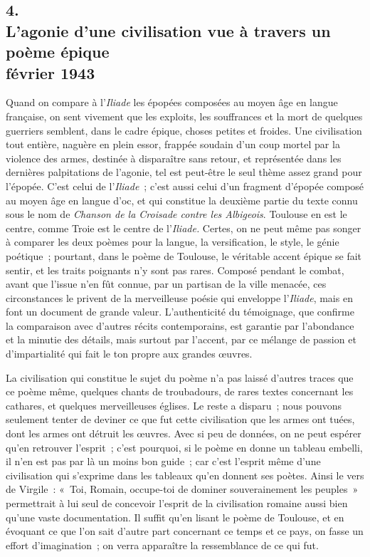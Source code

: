 \documentclass[french,twoside]{book} %
\begin{document}
\subsection[{4. L’agonie d’une civilisation vue à travers un poème épique, février 1943}]{4. \\
L’agonie d’une civilisation vue à travers un poème épique \\
février 1943}
\noindent \par
Quand on compare à l'{\itshape Iliade} les épopées composées au moyen âge en langue française, on sent vivement que les exploits, les souffrances et la mort de quelques guerriers semblent, dans le cadre épique, choses petites et froides. Une civilisation tout entière, naguère en plein essor, frappée soudain d'un coup mortel par la violence des armes, destinée à disparaître sans retour, et représentée dans les dernières palpitations de l'agonie, tel est peut-être le seul thème assez grand pour l'épopée. C'est celui de l'{\itshape Iliade} ; c'est aussi celui d'un fragment d'épopée composé au moyen âge en langue d'oc, et qui constitue la deuxième partie du texte connu sous le nom de {\itshape Chanson de la Croisade contre les Albigeois}. Toulouse en est le centre, comme Troie est le centre de l'{\itshape Iliade.} Certes, on ne peut même pas songer à comparer les deux poèmes pour la langue, la versification, le style, le génie poétique ; pourtant, dans le poème de Toulouse, le véritable accent épique se fait sentir, et les traits poignants n'y sont pas rares. Composé pendant le combat, avant que l'issue n'en fût connue, par un partisan de la ville menacée, ces circonstances le privent de la merveil­leuse poésie qui enveloppe l'{\itshape Iliade}, mais en font un document de grande valeur. L'authenticité du témoignage, que confirme la comparaison avec d'au­tres récits contemporains, est garantie par l'abondance et la minutie des détails, mais surtout par l'accent, par ce mélange de passion et d'impartialité qui fait le ton propre aux grandes œuvres.\par
La civilisation qui constitue le sujet du poème n'a pas laissé d'autres traces que ce poème même, quelques chants de troubadours, de rares textes concer­nant les cathares, et quelques merveilleuses églises. Le reste a disparu ; nous pouvons seulement tenter de deviner ce que fut cette civilisation que les armes ont tuées, dont les armes ont détruit les œuvres. Avec si peu de données, on ne peut espérer qu'en retrouver l'esprit ; c'est pourquoi, si le poème en donne un tableau embelli, il n'en est pas par là un moins bon guide ; car c'est l'esprit même d'une civilisation qui s'exprime dans les tableaux qu'en donnent ses poètes. Ainsi le vers de Virgile : « Toi, Romain, occupe-toi de dominer souve­rainement les peuples » permettrait à lui seul de concevoir l'esprit de la civilisation romaine aussi bien qu'une vaste documentation. Il suffit qu'en lisant le poème de Toulouse, et en évoquant ce que l'on sait d'autre part con­cernant ce temps et ce pays, on fasse un effort d'imagination ; on verra apparaître la ressemblance de ce qui fut.\par
\end{document}
